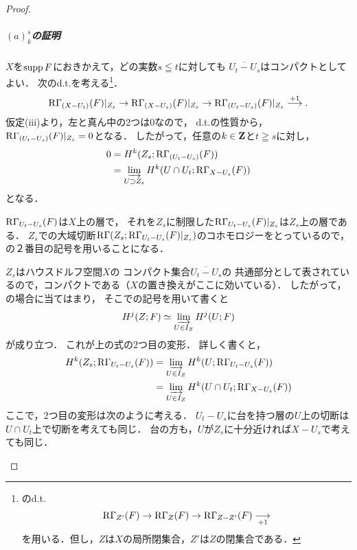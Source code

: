\begin{proof}
    \subparagraph*{\((a)_k^s\)の証明}
    \(X\)を\(\supp{F}\)におきかえて，どの実数\(s\leqq t\)に対しても
    \(\overline{U_t-U_s}\)はコンパクトとしてよい．
    次のd.t.を考える\footnote{
        \cite[(2.6.32)]{KS90}のd.t.
        \[
            \RG_{Z'}(F)\to\RG_{Z}(F)\to\RG_{Z-Z'}(F)\underset{+1}{\longrightarrow}
        \]
        を用いる．但し，\(Z\)は\(X\)の局所閉集合，\(Z'\)は\(Z\)の閉集合である．
    }．
    \[
        \RG_{(X-U_t)}(F)\rvert_{Z_s}\to
        \RG_{(X-U_s)}(F)\rvert_{Z_s}\to
        \RG_{(U_t-U_s)}(F)\rvert_{Z_s}
        \overset{+1}{\longrightarrow}.
    \]
    仮定(iii)より，左と真ん中の2つは0なので，
    d.t.の性質から，\(\RG_{(U_t-U_s)}(F)\rvert_{Z_s}=0\)となる．
    したがって，任意の\(k\in\zz\)と\(t\geqq s\)に対し，
    \begin{align*}
        0&=H^k(Z_s;\RG_{(U_t-U_s)}(F))\\
        &=\indlim[U\supset Z_s]H^k(U\cap U_t;\RG_{X-U_s}(F))
    \end{align*}
    となる．
    \begin{center}
        \begin{minipage}{.9\textwidth}
        \begin{redleftbar}
            \(\RG_{U_t-U_s}(F)\)は\(X\)上の層で，
            それを\(Z_s\)に制限した\(\RG_{U_t-U_s}(F)\rvert_{Z_s}\)は\(Z_s\)上の層である．
            \(Z_s\)での大域切断\(\RG(Z_s;\RG_{U_t-U_s}(F)\rvert_{Z_s})\)のコホモロジーをとっているので，
            \cite[Notations 2.6.8]{KS90}の２番目の記号を用いることになる．

            \(Z_s\)はハウスドルフ空間\(X\)の
            コンパクト集合\(\overline{U_t-U_s}\)の
            共通部分として表されているので，コンパクトである（\(X\)の置き換えがここに効いている）．
            したがって，\cite[Remark 2.6.9 (ii)]{KS90}の場合に当てはまり，
            そこでの記号を用いて書くと
            \[H^j(Z;F)\simeq\indlim[U\in I_Z]H^j(U;F)\]が成り立つ．
            これが上の式の2つ目の変形．
            詳しく書くと，
            \begin{align*}
                H^k(Z_s;\RG_{U_t-U_s}(F))
                &=\indlim[U\in I_Z]H^k(U;\RG_{U_t-U_s}(F))\\
                &=\indlim[U\in I_Z]H^k(U\cap U_t;\RG_{X-U_s}(F))
            \end{align*}
            ここで，2つ目の変形は次のように考える．
            \(U_t-U_s\)に台を持つ層の\(U\)上の切断は\(U\cap U_t\)上で切断を考えても同じ．
            台の方も，\(U\)が\(Z_s\)に十分近ければ\(X-U_s\)で考えても同じ．
        \end{redleftbar}
    \end{minipage}
        
    \end{center}
\end{proof}

